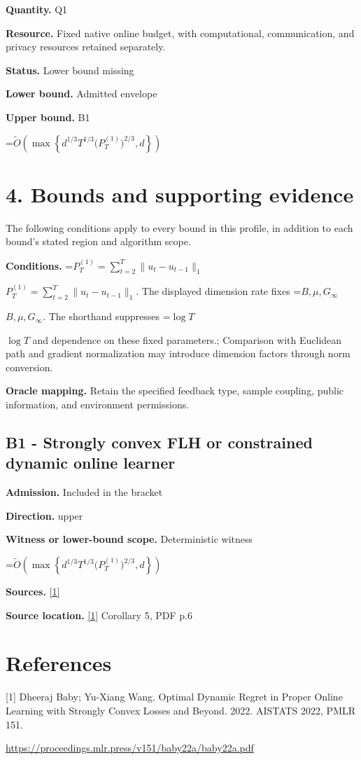 \documentclass[10pt,a4paper]{article}
\newcommand{\AtlasMath}[1]{\par\begingroup\centering\setbox0=\hbox{$\displaystyle #1$}\ifdim\wd0>1.4\linewidth\typeout{ATLAS WIDE FORMULA: \the\wd0}\fi\ifdim\wd0>\linewidth\resizebox{\linewidth}{!}{\box0}\else\box0\fi\par\endgroup}
\newcommand{\AtlasInlineMath}[1]{\begingroup\setbox0=\hbox{$#1$}\ifdim\wd0>.4\linewidth\endgroup\AtlasMath{#1}\else\endgroup$#1$\fi}
\begin{document}
\textbf{Quantity.} Q1

\textbf{Resource.} Fixed native online budget, with computational, communication, and privacy resources retained separately.

\textbf{Status.} Lower bound missing

\textbf{Lower bound.} Admitted envelope

\textbf{Upper bound.} B1

\AtlasMath{\widetilde{O}\!\left(\max\!\left\{d^{1/3}T^{1/3}\bigl(P_T^{(1)}\bigr)^{2/3},d\right\}\right)}
\section{4. Bounds and supporting evidence}
The following conditions apply to every bound in this profile, in addition to each bound's stated region and algorithm scope.

\textbf{Conditions.} \AtlasInlineMath{P_T^{(1)}=\sum_{t=2}^T\|u_t-u_{t-1}\|_1}. The displayed dimension rate fixes \AtlasInlineMath{B,\mu,G_\infty}. The shorthand suppresses \AtlasInlineMath{\log T} and dependence on these fixed parameters.; Comparison with Euclidean path and gradient normalization may introduce dimension factors through norm conversion.

\textbf{Oracle mapping.} Retain the specified feedback type, sample coupling, public information, and environment permissions.

\subsection{B1 - Strongly convex FLH or constrained dynamic online learner}
\textbf{Admission.} Included in the bracket

\textbf{Direction.} upper

\textbf{Witness or lower-bound scope.} Deterministic witness

\AtlasMath{\widetilde{O}\!\left(\max\!\left\{d^{1/3}T^{1/3}\bigl(P_T^{(1)}\bigr)^{2/3},d\right\}\right)}
\textbf{Sources.} \href{https://proceedings.mlr.press/v151/baby22a/baby22a.pdf}{[1]}

\textbf{Source location.} \href{https://proceedings.mlr.press/v151/baby22a/baby22a.pdf}{[1]} Corollary 5, PDF p.6

\section{References}
[1] Dheeraj Baby; Yu-Xiang Wang. Optimal Dynamic Regret in Proper Online Learning with Strongly Convex Losses and Beyond. 2022. AISTATS 2022, PMLR 151.

\url{https://proceedings.mlr.press/v151/baby22a/baby22a.pdf}
\end{document}
